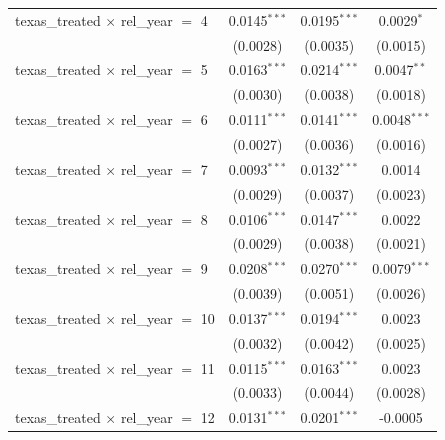 \begin{tabular}{lccc}
   texas\_treated $\times$ rel\_year $=$ 4      & 0.0145$^{***}$        & 0.0195$^{***}$         & 0.0029$^{*}$\\   
                                                & (0.0028)              & (0.0035)               & (0.0015)\\   
   texas\_treated $\times$ rel\_year $=$ 5      & 0.0163$^{***}$        & 0.0214$^{***}$         & 0.0047$^{**}$\\   
                                                & (0.0030)              & (0.0038)               & (0.0018)\\   
   texas\_treated $\times$ rel\_year $=$ 6      & 0.0111$^{***}$        & 0.0141$^{***}$         & 0.0048$^{***}$\\   
                                                & (0.0027)              & (0.0036)               & (0.0016)\\   
   texas\_treated $\times$ rel\_year $=$ 7      & 0.0093$^{***}$        & 0.0132$^{***}$         & 0.0014\\   
                                                & (0.0029)              & (0.0037)               & (0.0023)\\   
   texas\_treated $\times$ rel\_year $=$ 8      & 0.0106$^{***}$        & 0.0147$^{***}$         & 0.0022\\   
                                                & (0.0029)              & (0.0038)               & (0.0021)\\   
   texas\_treated $\times$ rel\_year $=$ 9      & 0.0208$^{***}$        & 0.0270$^{***}$         & 0.0079$^{***}$\\   
                                                & (0.0039)              & (0.0051)               & (0.0026)\\   
   texas\_treated $\times$ rel\_year $=$ 10     & 0.0137$^{***}$        & 0.0194$^{***}$         & 0.0023\\   
                                                & (0.0032)              & (0.0042)               & (0.0025)\\   
   texas\_treated $\times$ rel\_year $=$ 11     & 0.0115$^{***}$        & 0.0163$^{***}$         & 0.0023\\   
                                                & (0.0033)              & (0.0044)               & (0.0028)\\   
   texas\_treated $\times$ rel\_year $=$ 12     & 0.0131$^{***}$        & 0.0201$^{***}$         & -0.0005\\   

\end{tabular}
